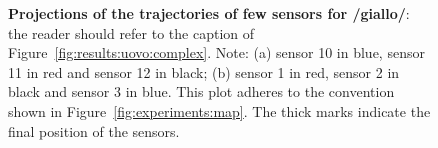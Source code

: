 \begin{figure}
  \centering
	\hspace{0.05\textwidth}

	\caption[Projections of the trajectories of few sensors for /giallo/]{\textbf{Projections of the trajectories of few sensors for /giallo/}: 
	the reader should refer to the caption of
	Figure~\ref{fig:results:uovo:complex}.
	Note: (a) sensor 10 in blue, sensor 11 in red and sensor 12 in black; 
	(b) sensor 1 in red, sensor 2 in black and sensor 3 in blue.
	This plot adheres to the convention shown in 
	Figure~\ref{fig:experiments:map}.
	The thick marks indicate the final position of the sensors.
	}
	\label{fig:results:giallo:complex}
\end{figure}
